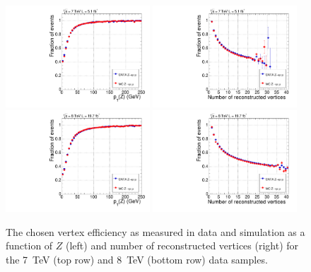 \begin{figure}
  \includegraphics[width=0.48\textwidth]{analysis_comps/plots/vertex_bdt_efficiency_pt_7TeV.pdf}
  \includegraphics[width=0.48\textwidth]{analysis_comps/plots/vertex_bdt_efficiency_nvtx_7TeV.pdf} \\
  \includegraphics[width=0.48\textwidth]{analysis_comps/plots/vertex_bdt_efficiency_pt_8TeV.pdf}
  \includegraphics[width=0.48\textwidth]{analysis_comps/plots/vertex_bdt_efficiency_nvtx_8TeV.pdf} 
  \caption[The efficiency of locating the correct vertex]{The chosen vertex efficiency as measured in \Zmumu data and \MC simulation as a function of $Z$ \pT (left) and number of reconstructed vertices (right) for the 7~TeV (top row) and 8~TeV (bottom row) data samples.}
  \label{fig:vertex_bdt_efficiency}
\end{figure}

